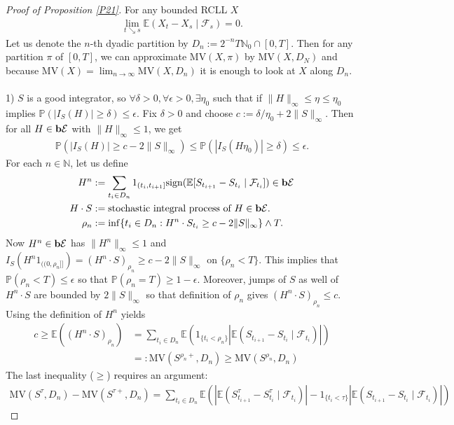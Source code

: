 \documentclass[12pt,a4paper, twoside]{article}
\theoremstyle{definition}
\newcommand{\EE}{\mathbb{E}} %
\newcommand{\PP}{\mathbb{P}} %
\newcommand{\simple}{\textbf{\text{b}}\mathcal{E}}
\newcommand{\sign}{\text{sign}}
\newcommand{\MV}{\text{MV}}
\begin{document}
\begin{proof}[Proof of Proposition \ref{P21}] For any bounded RCLL $X$ 
\begin{align*}
\lim_{t \searrow s} \EE(X_t-X_s \mid \mathcal{F}_s)=0.
\end{align*}
Let us denote the $n$-th dyadic partition by $D_n:= 2^{-n} T \mathbb{N}_0 \cap [0,T]$. Then for any partition $\pi$ of $[0,T]$, we can approximate $\MV(X, \pi)$ by $\MV(X, D_N)$ and because $\MV(X) = \lim_{n \to \infty} \MV(X, D_n)$ it is enough to look at $X$ along $D_n$. 
\\
\\
1) $S$ is a good integrator, so $\forall \delta >0, \forall \epsilon>0, \exists \eta_0$ such that if $\|H\|_\infty \leq \eta \leq \eta_0$ implies $\PP(|I_S(H)| \geq \delta) \leq \epsilon$. Fix $\delta >0$ and choose $c:= \delta/ \eta_0 + 2 \|S\|_\infty$. Then for all $H \in \simple$ with $\|H\|_\infty \leq 1$, we get 
\begin{align*}
\PP(|I_S(H)| \geq c- 2 \|S\|_\infty) \leq \PP(|I_S(H \eta_0)| \geq \delta) \leq \epsilon. 
\end{align*}
\newpage
For each $n \in \mathbb{N}$, let us define
\begin{align*}
H^n &:= \sum_{t_i \in D_n} 1_{(t_i, t_{i+1}]} \sign( \EE[S_{t_{i+1}}-S_{t_i} \mid \mathcal{F}_{t_i}]) \in \simple \\
H \cdot S &:= \text{stochastic integral process of } H \in \simple. \\
\rho_n&:= \inf\{ t_i \in D_n : H^n \cdot S_{t_i} \geq c -2\|S\|_\infty \} \wedge T.
\end{align*}
Now $H^n \in \simple$ has $\|H^n\|_\infty \leq 1$ and $I_S(H^n 1_{(\!(0, \rho_n]\!]}) = (H^n \cdot S)_{\rho_n} \geq c-2\|S\|_\infty$ on $\{ \rho_n < T\}$. This implies that $\PP( \rho_n < T) \leq \epsilon$ so that $\PP( \rho_n = T) \geq 1- \epsilon$. Moreover, jumps of $S$ as well of $H^n \cdot S$ are bounded by $2 \|S\|_\infty$ so that definition of $\rho_n$ gives $(H^n \cdot S)_{\rho_n} \leq c$. Using the definition of $H^n$ yields 
\begin{align*}
c \geq \mathbb{E}((H^n \cdot S)_{\rho_n}) &= \sum_{t_i \in D_n} \EE (1_{\{t_i < \rho_n\}} | \EE(S_{t_{i+1}}-S_{t_i} \mid \mathcal{F}_{t_i}) | ) \tag{*} \\
&=: \MV ( S^{\rho_n+}, D_n) \geq \MV(S^{\rho_n}, D_n)
\end{align*}
The last inequality ($\geq$) requires an argument: 
\begin{align*}
\MV(S^\tau, D_n)- \MV(S^{\tau+}, D_n)= \sum_{t_i \in D_n} \mathbb{E}( | \EE( S_{t_{i+1}}^\tau- S_{t_i}^\tau \mid \mathcal{F}_{t_i}) | - 1_{\{t_i < \tau\}} | \EE(S_{t_{i+1}}- S_{t_i} \mid \mathcal{F}_{t_i}) |) 

\end{align*}
\end{proof}
\end{document}
